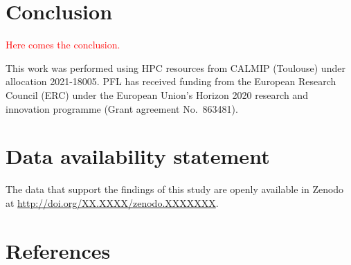 \documentclass[aip,jcp,reprint,noshowkeys,superscriptaddress]{revtex4-1}
\newcommand{\titou}[1]{\textcolor{red}{#1}}
\begin{document}
\section{Conclusion}

\titou{Here comes the conclusion.}

\begin{acknowledgements}
This work was performed using HPC resources from CALMIP (Toulouse) under allocation 2021-18005.
PFL has received funding from the European Research Council (ERC) under the European Union's Horizon 2020 research and innovation programme (Grant agreement No.~863481).
\end{acknowledgements}

\section*{Data availability statement}
The data that support the findings of this study are openly available in Zenodo at \href{http://doi.org/XX.XXXX/zenodo.XXXXXXX}{http://doi.org/XX.XXXX/zenodo.XXXXXXX}.

\section*{References}

\end{document}
